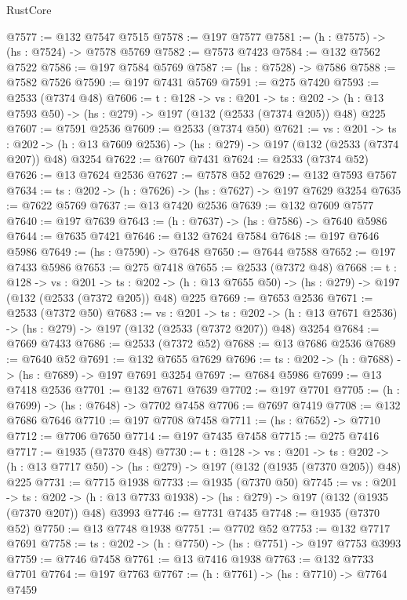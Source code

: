 \begin{lexlean}{RustCore}
\begin{coremodule}
@7577 := @132 @7547 @7515
@7578 := @197 @7577
@7581 := (h : @7575) -> (hs : @7524) -> @7578 @5769
@7582 := @7573 @7423
@7584 := @132 @7562 @7522
@7586 := @197 @7584 @5769
@7587 := (hs : @7528) -> @7586
@7588 := @7582 @7526
@7590 := @197 @7431 @5769
@7591 := @275 @7420
@7593 := @2533 (@7374 @48)
@7606 := {t : @128} ->
  {vs : @201} ->
  {ts : @202} -> (h : @13 @7593 @50) -> (hs : @279) -> @197 (@132 (@2533 (@7374 @205)) @48) @225
@7607 := @7591 @2536
@7609 := @2533 (@7374 @50)
@7621 := {vs : @201} ->
  {ts : @202} -> (h : @13 @7609 @2536) -> (hs : @279) -> @197 (@132 (@2533 (@7374 @207)) @48) @3254
@7622 := @7607 @7431
@7624 := @2533 (@7374 @52)
@7626 := @13 @7624 @2536
@7627 := @7578 @52
@7629 := @132 @7593 @7567
@7634 := {ts : @202} -> (h : @7626) -> (hs : @7627) -> @197 @7629 @3254
@7635 := @7622 @5769
@7637 := @13 @7420 @2536
@7639 := @132 @7609 @7577
@7640 := @197 @7639
@7643 := (h : @7637) -> (hs : @7586) -> @7640 @5986
@7644 := @7635 @7421
@7646 := @132 @7624 @7584
@7648 := @197 @7646 @5986
@7649 := (hs : @7590) -> @7648
@7650 := @7644 @7588
@7652 := @197 @7433 @5986
@7653 := @275 @7418
@7655 := @2533 (@7372 @48)
@7668 := {t : @128} ->
  {vs : @201} ->
  {ts : @202} -> (h : @13 @7655 @50) -> (hs : @279) -> @197 (@132 (@2533 (@7372 @205)) @48) @225
@7669 := @7653 @2536
@7671 := @2533 (@7372 @50)
@7683 := {vs : @201} ->
  {ts : @202} -> (h : @13 @7671 @2536) -> (hs : @279) -> @197 (@132 (@2533 (@7372 @207)) @48) @3254
@7684 := @7669 @7433
@7686 := @2533 (@7372 @52)
@7688 := @13 @7686 @2536
@7689 := @7640 @52
@7691 := @132 @7655 @7629
@7696 := {ts : @202} -> (h : @7688) -> (hs : @7689) -> @197 @7691 @3254
@7697 := @7684 @5986
@7699 := @13 @7418 @2536
@7701 := @132 @7671 @7639
@7702 := @197 @7701
@7705 := (h : @7699) -> (hs : @7648) -> @7702 @7458
@7706 := @7697 @7419
@7708 := @132 @7686 @7646
@7710 := @197 @7708 @7458
@7711 := (hs : @7652) -> @7710
@7712 := @7706 @7650
@7714 := @197 @7435 @7458
@7715 := @275 @7416
@7717 := @1935 (@7370 @48)
@7730 := {t : @128} ->
  {vs : @201} ->
  {ts : @202} -> (h : @13 @7717 @50) -> (hs : @279) -> @197 (@132 (@1935 (@7370 @205)) @48) @225
@7731 := @7715 @1938
@7733 := @1935 (@7370 @50)
@7745 := {vs : @201} ->
  {ts : @202} -> (h : @13 @7733 @1938) -> (hs : @279) -> @197 (@132 (@1935 (@7370 @207)) @48) @3993
@7746 := @7731 @7435
@7748 := @1935 (@7370 @52)
@7750 := @13 @7748 @1938
@7751 := @7702 @52
@7753 := @132 @7717 @7691
@7758 := {ts : @202} -> (h : @7750) -> (hs : @7751) -> @197 @7753 @3993
@7759 := @7746 @7458
@7761 := @13 @7416 @1938
@7763 := @132 @7733 @7701
@7764 := @197 @7763
@7767 := (h : @7761) -> (hs : @7710) -> @7764 @7459

\end{coremodule}
\end{lexlean}

